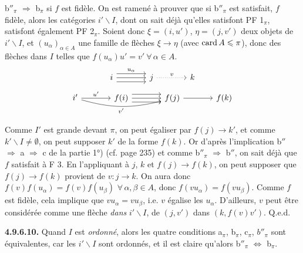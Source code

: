 b$''_\pi$ $\Longrightarrow$ b$_\pi$ si $f$ est fidèle. On est ramené à prouver que si b$''_\pi$ est satisfait, $f$ fidèle, alors les catégories $i'\backslash I$, dont on sait déjà qu'elles satisfont PF 1$_\pi$, satisfont également PF 2$_\pi$. Soient donc $\xi = (i, u')$, $\eta = (j, v')$ deux objets de $i'\backslash I$, et $(u_\alpha)_{\alpha\in A}$ une famille de flèches $\xi \longrightarrow \eta$ (avec $\operatorname{card} A \leqslant \pi$), donc des flèches dans $I$ telles que $f(u_\alpha)u' = v' \ \forall\, \alpha \in A$.
\[
\begin{tikzcd}[column sep=large]
i \arrow[r, shift left=2, "u_\alpha"] \arrow[r] \arrow[r, shift right=2] & j \arrow[r, dotted, "v"] & k
\end{tikzcd}
\]
\[
\begin{tikzcd}[column sep=large]
i' \arrow[r, "u'"] \arrow[rr, bend right=15, "v'"'] & f(i) \arrow[r, shift left=2] \arrow[r] \arrow[r, shift right=2] & f(j) \arrow[r] & f(k)
\end{tikzcd}
\]

Comme $I'$ est grande devant $\pi$, on peut égaliser par $f(j) \longrightarrow k'$, et comme $k'\backslash I \neq \emptyset$, on peut supposer $k'$ de la forme $f(k)$. Or
d'après l'implication b$''$ $\Longrightarrow$ a $\Longrightarrow$ c de la partie 1°) (cf. page 235) et comme b$''_\pi$ $\Longrightarrow$ b$''$, on sait déjà que $f$ satisfait à F 3. En l'appliquant à $j$, $k$ et $f(j) \longrightarrow f(k)$, on peut
supposer que $f(j) \longrightarrow f(k)$ provient de $v : j \longrightarrow k$. On aura donc $f(v)f(u_\alpha) = f(v)f(u_\beta)$ $\forall\, \alpha, \beta \in A$, donc $f(vu_\alpha) = f(vu_\beta)$. Comme $f$ est fidèle, cela implique que $vu_\alpha = vu_\beta$, i.e. $v$ égalise les $u_\alpha$. D'ailleurs, $v$ peut être considérée comme une flèche \textit{dans} $i'\backslash I$, de $(j, v')$ dans $(k, f(v)v')$. Q.e.d.

\textbf{4.9.6.10.} Quand $I$ est \textit{ordonné}, alors les quatre conditions a$_\pi$, b$_\pi$, c$_\pi$, $b''_\pi$ sont équivalentes, car les $i'\backslash I$ sont ordonnés, et il est claire qu'alors b$''_\pi$ $\Longleftrightarrow$ b$_\pi$. %



